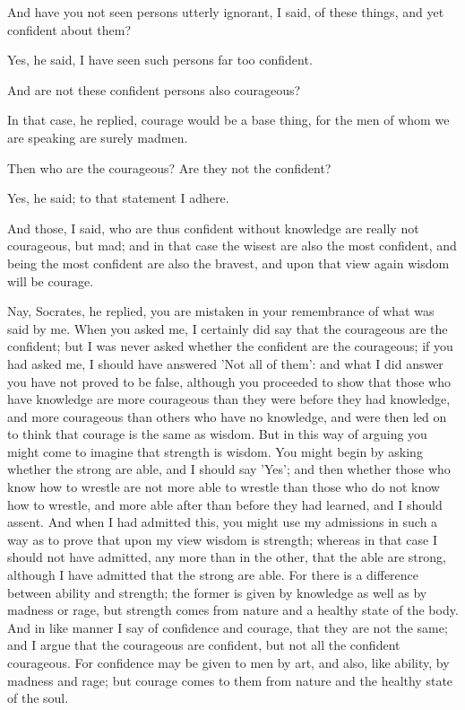 \documentclass[11pt,letter]{article}
\begin{document}
\par  And have you not seen persons utterly ignorant, I said, of these things, and yet confident about them?

\par  Yes, he said, I have seen such persons far too confident.

\par  And are not these confident persons also courageous?

\par  In that case, he replied, courage would be a base thing, for the men of whom we are speaking are surely madmen.

\par  Then who are the courageous? Are they not the confident?

\par  Yes, he said; to that statement I adhere.

\par  And those, I said, who are thus confident without knowledge are really not courageous, but mad; and in that case the wisest are also the most confident, and being the most confident are also the bravest, and upon that view again wisdom will be courage.

\par  Nay, Socrates, he replied, you are mistaken in your remembrance of what was said by me. When you asked me, I certainly did say that the courageous are the confident; but I was never asked whether the confident are the courageous; if you had asked me, I should have answered 'Not all of them': and what I did answer you have not proved to be false, although you proceeded to show that those who have knowledge are more courageous than they were before they had knowledge, and more courageous than others who have no knowledge, and were then led on to think that courage is the same as wisdom. But in this way of arguing you might come to imagine that strength is wisdom. You might begin by asking whether the strong are able, and I should say 'Yes'; and then whether those who know how to wrestle are not more able to wrestle than those who do not know how to wrestle, and more able after than before they had learned, and I should assent. And when I had admitted this, you might use my admissions in such a way as to prove that upon my view wisdom is strength; whereas in that case I should not have admitted, any more than in the other, that the able are strong, although I have admitted that the strong are able. For there is a difference between ability and strength; the former is given by knowledge as well as by madness or rage, but strength comes from nature and a healthy state of the body. And in like manner I say of confidence and courage, that they are not the same; and I argue that the courageous are confident, but not all the confident courageous. For confidence may be given to men by art, and also, like ability, by madness and rage; but courage comes to them from nature and the healthy state of the soul.
\end{document}
